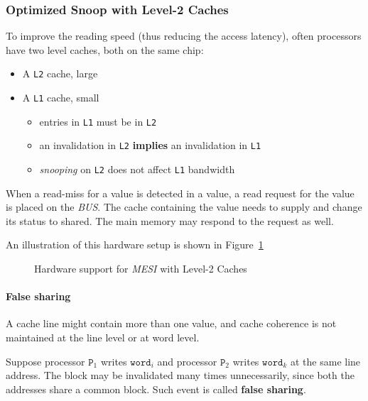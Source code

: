 \documentclass[english]{article}
\begin{document}
\subsubsection{Optimized Snoop with Level-2 Caches}

To improve the reading speed (thus reducing the access latency), often processors have two level caches, both on the same chip:

\begin{itemize}
  \item A \texttt{L2} cache, large
  \item A \texttt{L1} cache, small
        \begin{itemize}
          \item entries in \texttt{L1} must be in \texttt{L2}
          \item an invalidation in \texttt{L2} \textbf{implies} an invalidation in \texttt{L1}
          \item \textit{snooping} on \texttt{L2} does not affect \texttt{L1} bandwidth
        \end{itemize}
\end{itemize}

When a read-miss for a value is detected in a value, a read request for the value is placed on the \textit{BUS}.
The cache containing the value needs to supply and change its status to shared.
The main memory may respond to the request as well.

\bigskip
An illustration of this hardware setup is shown in Figure~\ref{fig:MESI-bus-rd-level-2}

\begin{figure}[htbp]
  \centering
  \bigskip
  \caption{Hardware support for \textit{MESI} with Level-2 Caches}
  \label{fig:MESI-bus-rd-level-2}
  \bigskip
\end{figure}

\paragraph{False sharing}

A cache line might contain more than one value, and cache coherence is not maintained at the line level or at word level.

Suppose processor \(\texttt{P}_1\) writes \(\texttt{word}_i\) and processor \(\texttt{P}_2\) writes \(\texttt{word}_k\) at the same line address.
The block may be invalidated many times unnecessarily, since both the addresses share a common block.
Such event is called \textbf{false sharing}.
\end{document}
